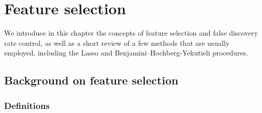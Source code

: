 \chapter{Feature selection}\label{ch:fs}

We introduce in this chapter the concepts of feature selection and false discovery rate control,
as well as a short review of a few methods that are usually employed,
including the Lasso and Benjamini–Hochberg-Yekutieli procedures.

\section{Background on feature selection}\label{sec:bfs}

\subsection{Definitions}\label{subsec:fs_defs}

